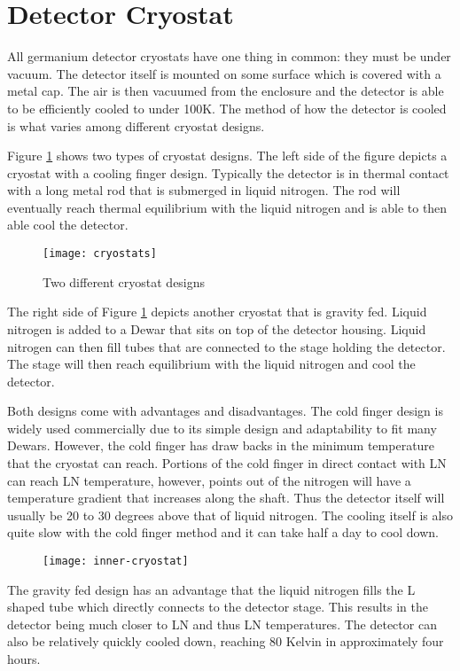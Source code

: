 \section{Detector Cryostat}
All germanium detector cryostats have one thing in common: they must be under vacuum.
The detector itself is mounted on some surface which is covered with a metal cap.
The air is then vacuumed from the enclosure and the detector is able to be efficiently cooled to under 100K.
The method of how the detector is cooled is what varies among different cryostat designs.

Figure \ref{fig:cryostats} shows two types of cryostat designs.
The left side of the figure depicts a cryostat with a cooling finger design.
Typically the detector is in thermal contact with a long metal rod that is submerged in liquid nitrogen.
The rod will eventually reach thermal equilibrium with the liquid nitrogen and is able to then able cool the detector.
\begin{figure}[htpb]
\centering
\texttt{[image: cryostats]}
\caption{Two different cryostat designs}
\label{fig:cryostats}
\end{figure}
The right side of Figure \ref{fig:cryostats} depicts another cryostat that is gravity fed.
Liquid nitrogen is added to a Dewar that sits on top of the detector housing.
Liquid nitrogen can then fill tubes that are connected to the stage holding the detector.
The stage will then reach equilibrium with the liquid nitrogen and cool the detector.

Both designs come with advantages and disadvantages.
The cold finger design is widely used commercially due to its simple design and adaptability to fit many Dewars.
However, the cold finger has draw backs in the minimum temperature that the cryostat can reach.
Portions of the cold finger in direct contact with LN can reach LN temperature, however, points out of the nitrogen will have a temperature gradient that increases along the shaft.
Thus the detector itself will usually be 20 to 30 degrees above that of liquid nitrogen.
The cooling itself is also quite slow with the cold finger method and it can take half a day to cool down.
\begin{figure}[htpb]
\centering
\texttt{[image: inner-cryostat]}
\caption{}
\label{fig:inner-cryostat}
\end{figure}
The gravity fed design has an advantage that the liquid nitrogen fills the L shaped tube which directly connects to the detector stage.
This results in the detector being much closer to LN  and thus LN temperatures.
The detector can also be relatively quickly cooled down, reaching 80 Kelvin in approximately four hours.

